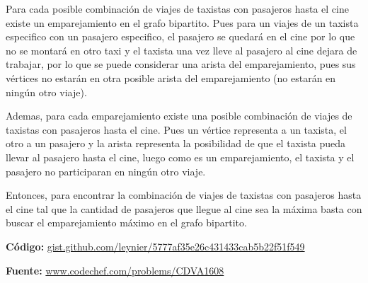 \documentclass[12pt]{article}
\newcommand{\nl}{\vspace{0.3cm}}
\begin{document}
\nl

Para cada posible combinación de viajes de taxistas con pasajeros hasta el cine existe un emparejamiento en el grafo bipartito. Pues para un viajes de un taxista especifico con un pasajero especifico, el pasajero se quedará en el cine por lo que no se montará en otro taxi y el taxista una vez lleve al pasajero al cine dejara de trabajar, por lo que se puede considerar una arista del emparejamiento, pues sus vértices no estarán en otra posible arista del emparejamiento (no estarán en ningún otro viaje).

\nl

Ademas, para cada emparejamiento existe una posible combinación de viajes de taxistas con pasajeros hasta el cine. Pues un vértice representa a un taxista, el otro a un pasajero y la arista representa la posibilidad de que el taxista pueda llevar al pasajero hasta el cine, luego como es un emparejamiento, el taxista y el pasajero no participaran en ningún otro viaje.

\nl

Entonces, para encontrar la combinación de viajes de taxistas con pasajeros hasta el cine tal que la cantidad de pasajeros que llegue al cine sea la máxima basta con buscar el emparejamiento máximo en el grafo bipartito.

\nl

\textbf{Código:} \href{https://gist.github.com/leynier/5777af35e26c431433cab5b22f51f549}{gist.github.com/leynier/5777af35e26c431433cab5b22f51f549}

\nl

\textbf{Fuente:} \href{https://www.codechef.com/problems/CDVA1608}{www.codechef.com/problems/CDVA1608}

\newpage

\nocite{*}


\end{document}
